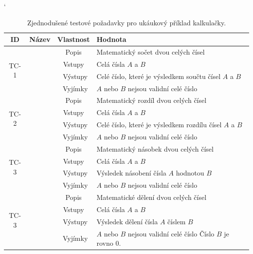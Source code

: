 \documentclass[czech, ma, kiv, he, iso690alph, pdf, viewonly]{fasthesis}
\begin{document}
    \begin{table}
        \catcode`
        \begin{tabular}{|c|c|c|p{7.5cm}|}
            \hline
            \textbf{ID} & \textbf{Název} & \textbf{Vlastnost} & \textbf{Hodnota} \\
            \hline
            \multirow{4}{*}{TC-1} & \multirow{4}{*}{Součet} & Popis & Matematický sočet dvou celých čísel \\
            \cline{3-4}
            & & Vstupy & Celá čísla \(A\) a \(B\) \\
            \cline{3-4}
            & & Výstupy & Celé číslo, které je výsledkem součtu čísel \(A\) a \(B\) \\
            \cline{3-4}
            & & Vyjímky & \(A\) nebo \(B\) nejsou validní celé číslo \\
            \hline
            \multirow{4}{*}{TC-2} & \multirow{4}{*}{Rozdíl} & Popis & Matematický rozdíl dvou celých čísel \\
            \cline{3-4}
            & & Vstupy & Celá čísla \(A\) a \(B\) \\
            \cline{3-4}
            & & Výstupy & Celé číslo, které je výsledkem rozdílu čísel \(A\) a \(B\) \\
            \cline{3-4}
            & & Vyjímky & \(A\) nebo \(B\) nejsou validní celé číslo \\
            \hline
            \multirow{4}{*}{TC-3} & \multirow{4}{*}{Násobení} & Popis & Matematický násobek dvou celých čísel \\
            \cline{3-4}
            & & Vstupy & Celá čísla \(A\) a \(B\) \\
            \cline{3-4}
            & & Výstupy & Výsledek násobení čísla \(A\) hodnotou \(B\) \\
            \cline{3-4}
            & & Vyjímky & \(A\) nebo \(B\) nejsou validní celé číslo \\
            \hline
            \multirow{4}{*}{TC-3} & \multirow{4}{*}{Dělení} & Popis & Matematické dělení dvou celých čísel \\
            \cline{3-4}
            & & Vstupy & Celá čísla \(A\) a \(B\) \\
            \cline{3-4}
            & & Výstupy & Výsledek dělení čísla \(A\) číslem \(B\) \\
            \cline{3-4}
            & & Vyjímky & \(A\) nebo \(B\) nejsou validní celé číslo \newline Číslo \(B\) je rovno \(0\). \\
            \hline
        \end{tabular}
        \centering
        \caption{Zjednodušené testové požadavky pro ukáukový příklad kalkulačky.}
        \label{tab:calc_tets_cases}
    \end{table}
\end{document}
